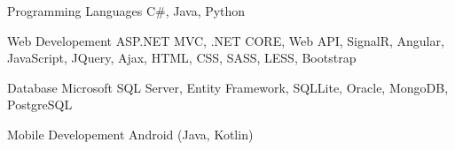 


\begin{cvskills}


\cvskill
{Programming Languages} %
{C\#, Java, Python} %


\cvskill
{Web Developement} %
{ASP.NET MVC, .NET CORE, Web API, SignalR, Angular, JavaScript, JQuery, Ajax, HTML, CSS, SASS, LESS, Bootstrap} %


\cvskill
{Database} %
{Microsoft SQL Server, Entity Framework, SQLLite, Oracle, MongoDB, PostgreSQL} %


\cvskill
{Mobile Developement} %
{Android (Java, Kotlin)} %


\end{cvskills}